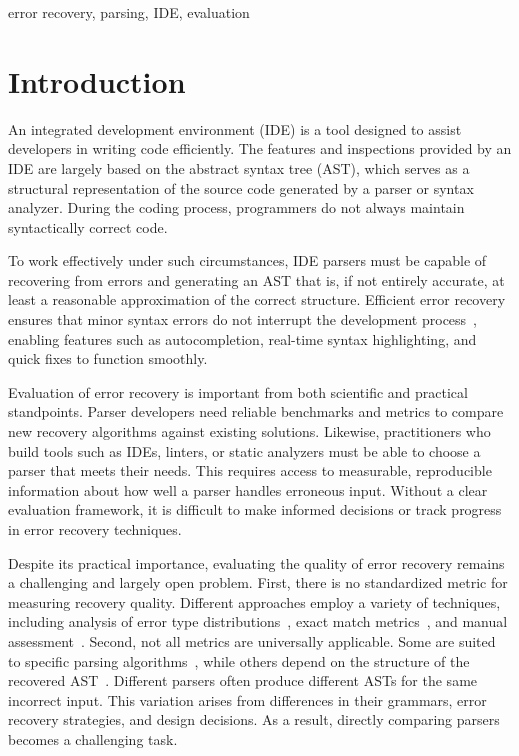 \documentclass[conference]{IEEEtran}
\begin{document}
\begin{IEEEkeywords}
error recovery, parsing, IDE, evaluation
\end{IEEEkeywords}

\section{Introduction}
An integrated development environment (IDE) is a tool designed to assist developers in writing code efficiently. The features and inspections provided by an IDE are largely based on the abstract syntax tree (AST), which serves as a structural representation of the source code generated by a parser or syntax analyzer. During the coding process, programmers do not always maintain syntactically correct code.

To work effectively under such circumstances, IDE parsers must be capable of recovering from errors and generating an AST that is, if not entirely accurate, at least a reasonable approximation of the correct structure. Efficient error recovery ensures that minor syntax errors do not interrupt the development process~\cite{ide-errors}, enabling features such as autocompletion, real-time syntax highlighting, and quick fixes to function smoothly. 

Evaluation of error recovery is important from both scientific and practical standpoints. Parser developers need reliable benchmarks and metrics to compare new recovery algorithms against existing solutions. Likewise, practitioners who build tools such as IDEs, linters, or static analyzers must be able to choose a parser that meets their needs. This requires access to measurable, reproducible information about how well a parser handles erroneous input. Without a clear evaluation framework, it is difficult to make informed decisions or track progress in error recovery techniques.

Despite its practical importance, evaluating the quality of error recovery remains a challenging and largely open problem. First, there is no standardized metric for measuring recovery quality. Different approaches employ a variety of techniques, including analysis of error type distributions~\cite{error-frequence}, exact match metrics~\cite{ai-recovery-large}, and manual assessment~\cite{forward-move, natural_recovery}. Second, not all metrics are universally applicable. Some are suited to specific parsing algorithms~\cite{panic}, while others depend on the structure of the recovered AST~\cite{fuzz_recovery, natural_recovery}. Different parsers often produce different ASTs for the same incorrect input. This variation arises from differences in their grammars, error recovery strategies, and design decisions. As a result, directly comparing parsers becomes a challenging task.
\end{document}
